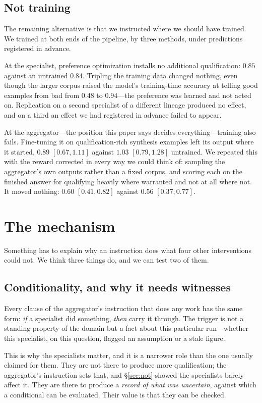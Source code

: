 \documentclass[11pt]{article}
\begin{document}
\subsection{Not training}
The remaining alternative is that we instructed where we should have trained.
We trained at both ends of the pipeline, by three methods, under predictions
registered in advance.

At the specialist, preference optimization installs no additional
qualification: $0.85$ against an untrained $0.84$. Tripling the training data
changed nothing, even though the larger corpus raised the model's training-time
accuracy at telling good examples from bad from $0.48$ to $0.94$---the
preference was learned and not acted on. Replication on a second specialist of
a different lineage produced no effect, and on a third an effect we had
registered in advance failed to appear.

At the aggregator---the position this paper says decides everything---training
also fails. Fine-tuning it on qualification-rich synthesis examples left its
output where it started, $0.89$ $[0.67,1.11]$ against $1.03$ $[0.79,1.28]$
untrained. We repeated this with the reward corrected in every way we could
think of: sampling the aggregator's own outputs rather than a fixed corpus,
and scoring each on the finished answer for qualifying heavily where warranted
and not at all where not. It moved nothing: $0.60$ $[0.41,0.82]$ against
$0.56$ $[0.37,0.77]$.

\section{The mechanism}
\label{sec:mech}
Something has to explain why an instruction does what four other interventions
could not. We think three things do, and we can test two of them.

\subsection{Conditionality, and why it needs witnesses}
Every clause of the aggregator's instruction that does any work has the same
form: \emph{if} a specialist did something, \emph{then} carry it through. The
trigger is not a standing property of the domain but a fact about this
particular run---whether this specialist, on this question, flagged an
assumption or a stale figure.

This is why the specialists matter, and it is a narrower role than the one
usually claimed for them. They are not there to produce more qualification;
the aggregator's instruction sets that, and \S\ref{sec:not} showed the
specialists barely affect it. They are there to produce a \emph{record of what
was uncertain}, against which a conditional can be evaluated. Their value is
that they can be checked.
\end{document}
